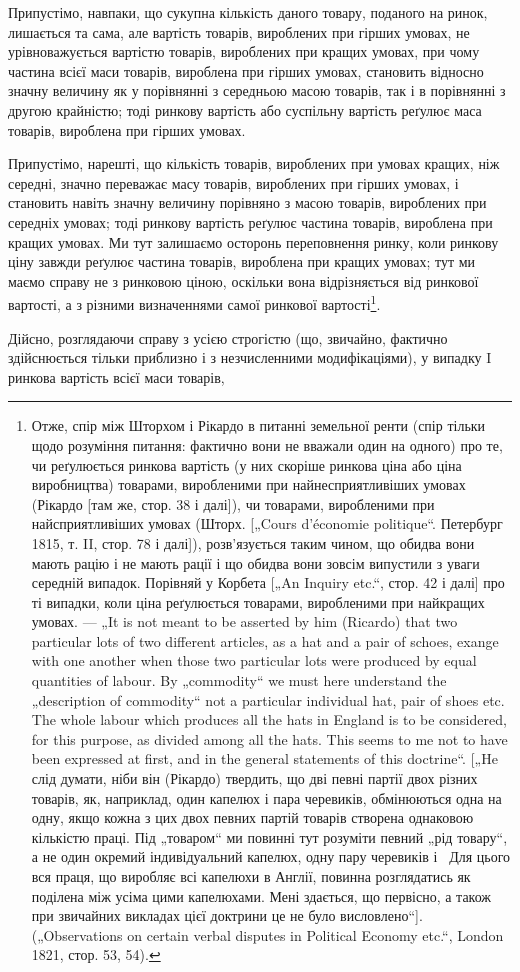 Припустімо, навпаки, що сукупна кількість даного товару,
поданого на ринок, лишається та сама, але вартість товарів,
вироблених при гірших умовах, не урівноважується вартістю
товарів, вироблених при кращих умовах, при чому частина всієї
маси товарів, вироблена при гірших умовах, становить відносно
значну величину як у порівнянні з середньою масою товарів,
так і в порівнянні з другою крайністю; тоді ринкову вартість
або суспільну вартість реґулює маса товарів, вироблена при
гірших умовах.

Припустімо, нарешті, що кількість товарів, вироблених при
умовах кращих, ніж середні, значно переважає масу товарів, вироблених при гірших умовах, і становить
навіть значну величину порівняно з масою товарів, вироблених при середніх умовах; тоді ринкову
вартість реґулює частина товарів, вироблена при
кращих умовах. Ми тут залишаємо осторонь переповнення ринку,
коли ринкову ціну завжди реґулює частина товарів, вироблена
при кращих умовах; тут ми маємо справу не з ринковою ціною,
оскільки вона відрізняється від ринкової вартості, а з різними
визначеннями самої ринкової вартості\footnote{
Отже, спір між Шторхом і Рікардо в питанні земельної ренти (спір
тільки щодо розуміння питання: фактично вони не вважали один на одного)
про те, чи реґулюється ринкова вартість (у них скоріше ринкова ціна або
ціна виробництва) товарами, виробленими при найнесприятливіших умовах
(Рікардо [там же, стор. 38 і далі]), чи товарами, виробленими при найсприятливіших умовах (Шторх.
[„Cours d’économie politique“. Петербург 1815, т. II,
стор. 78 і далі]), розв’язується таким чином, що обидва вони мають рацію
і не мають рації і що обидва вони зовсім випустили з уваги середній випадок.
Порівняй у Корбета [„An Inquiry etc.“, стор. 42 і далі] про ті випадки, коли
ціна реґулюється товарами, виробленими при найкращих умовах. — „It is not meant
to be asserted by him (Ricardo) that two particular lots of two different articles,
as a hat and a pair of schoes, exange with one another when those two particular
lots were produced by equal quantities of labour. By „commodity“ we must here
understand the „description of commodity“ not a particular individual hat, pair
of shoes etc. The whole labour which produces all the hats in England is to be
considered, for this purpose, as divided among all the hats. This seems to me not
to have been expressed at first, and in the general statements of this doctrine“. [„He
слід думати, ніби він (Рікардо) твердить, що дві певні партії двох різних товарів, як,
наприклад, один капелюх і пара черевиків, обмінюються одна на одну, якщо
кожна з цих двох певних партій товарів створена однаковою кількістю праці.
Під „товаром“ ми повинні тут розуміти певний „рід товару“, а не один окремий
індивідуальний капелюх, одну пару черевиків і~ Для цього вся праця, що виробляє всі капелюхи в
Англії, повинна розглядатись як поділена між усіма цими капелюхами. Мені здається, що первісно, а
також при звичайних викладах цієї
доктрини це не було висловлено“]. („Observations on certain verbal disputes in
Political Economy etc.“, London 1821, стор. 53, 54).
}.

Дійсно, розглядаючи справу з усією строгістю (що, звичайно,
фактично здійснюється тільки приблизно і з незчисленними модифікаціями), у випадку I ринкова
вартість всієї маси товарів,
\parbreak{}  %
